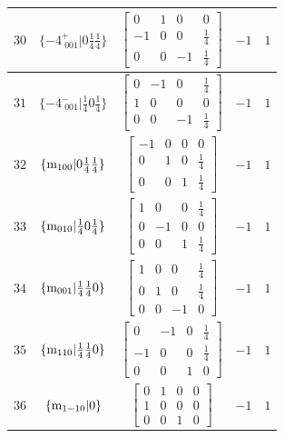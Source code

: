 \documentclass[fleqn,8pt]{jsarticle}
\begin{document}
\begin{longtable}{ccccc}
$ 30 $ & $ \{-4^{+}_{\,\,001}|0 \frac{1}{4} \frac{1}{4}\} $ & $ \begin{bmatrix} 0 & 1 & 0 & 0 \\ -1 & 0 & 0 & \frac{1}{4} \\ 0 & 0 & -1 & \frac{1}{4} \end{bmatrix} $ & $ -1 $ & $ 1 $ \\ \hline
$ 31 $ & $ \{-4^{-}_{\,\,001}|\frac{1}{4} 0 \frac{1}{4}\} $ & $ \begin{bmatrix} 0 & -1 & 0 & \frac{1}{4} \\ 1 & 0 & 0 & 0 \\ 0 & 0 & -1 & \frac{1}{4} \end{bmatrix} $ & $ -1 $ & $ 1 $ \\ \hline
$ 32 $ & $ \{{\rm m}_{100}|0 \frac{1}{4} \frac{1}{4}\} $ & $ \begin{bmatrix} -1 & 0 & 0 & 0 \\ 0 & 1 & 0 & \frac{1}{4} \\ 0 & 0 & 1 & \frac{1}{4} \end{bmatrix} $ & $ -1 $ & $ 1 $ \\ \hline
$ 33 $ & $ \{{\rm m}_{010}|\frac{1}{4} 0 \frac{1}{4}\} $ & $ \begin{bmatrix} 1 & 0 & 0 & \frac{1}{4} \\ 0 & -1 & 0 & 0 \\ 0 & 0 & 1 & \frac{1}{4} \end{bmatrix} $ & $ -1 $ & $ 1 $ \\ \hline
$ 34 $ & $ \{{\rm m}_{001}|\frac{1}{4} \frac{1}{4} 0\} $ & $ \begin{bmatrix} 1 & 0 & 0 & \frac{1}{4} \\ 0 & 1 & 0 & \frac{1}{4} \\ 0 & 0 & -1 & 0 \end{bmatrix} $ & $ -1 $ & $ 1 $ \\ \hline
$ 35 $ & $ \{{\rm m}_{110}|\frac{1}{4} \frac{1}{4} 0\} $ & $ \begin{bmatrix} 0 & -1 & 0 & \frac{1}{4} \\ -1 & 0 & 0 & \frac{1}{4} \\ 0 & 0 & 1 & 0 \end{bmatrix} $ & $ -1 $ & $ 1 $ \\ \hline
$ 36 $ & $ \{{\rm m}_{1-10}|0\} $ & $ \begin{bmatrix} 0 & 1 & 0 & 0 \\ 1 & 0 & 0 & 0 \\ 0 & 0 & 1 & 0 \end{bmatrix} $ & $ -1 $ & $ 1 $ \\ \hline

\end{longtable}
\end{document}

